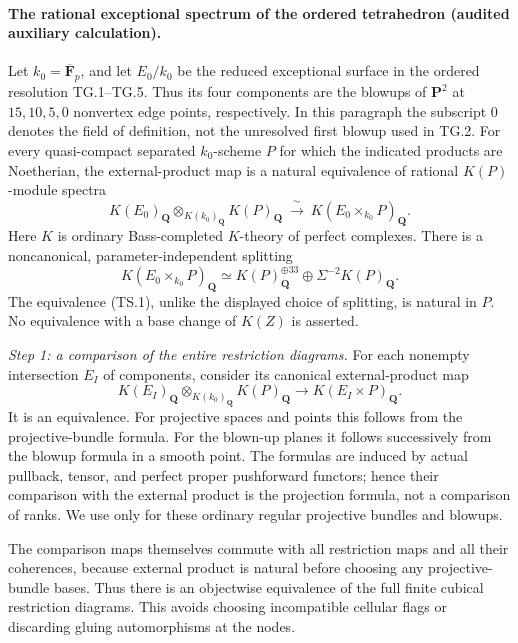 \paragraph{The rational exceptional spectrum of the ordered tetrahedron
(audited auxiliary calculation).}
Let $k_0=\overline{\mathbf F}_p$, and let $E_0/k_0$ be the reduced
exceptional surface in the ordered resolution TG.1--TG.5.  Thus its
four components are the blowups of $\mathbf P^2$ at $15,10,5,0$
nonvertex edge points, respectively.  In this paragraph the subscript
$0$ denotes the field of definition, not the unresolved first blowup
used in TG.2.  For every quasi-compact separated $k_0$-scheme $P$ for
which the indicated products are Noetherian, the external-product map
is a natural equivalence of rational $K(P)$-module spectra
\begin{equation}
 K(E_0)_{\mathbf Q}\otimes_{K(k_0)_{\mathbf Q}}K(P)_{\mathbf Q}
 \ \xrightarrow{\ \sim\ }\ K(E_0\times_{k_0}P)_{\mathbf Q}.
 \tag{TS.1}
\end{equation}
Here $K$ is ordinary Bass-completed $K$-theory of perfect complexes.
There is a noncanonical, parameter-independent splitting
\begin{equation}
 K(E_0\times_{k_0}P)_{\mathbf Q}
 \simeq K(P)_{\mathbf Q}^{\oplus33}
       \oplus \Sigma^{-2}K(P)_{\mathbf Q}.
 \tag{TS.2}
\end{equation}
The equivalence (TS.1), unlike the displayed choice of splitting, is
natural in $P$.  No equivalence with a base change of $K(Z)$ is asserted.

\emph{Step 1: a comparison of the entire restriction diagrams.}
For each nonempty intersection $E_I$ of components, consider its
canonical external-product map
\[
 K(E_I)_{\mathbf Q}\otimes_{K(k_0)_{\mathbf Q}}K(P)_{\mathbf Q}
       \longrightarrow K(E_I\times P)_{\mathbf Q}.
\]
It is an equivalence.  For projective spaces and points this follows
from the projective-bundle formula.  For the blown-up planes it follows
successively from the blowup formula in a smooth point.  The formulas
are induced by actual pullback, tensor, and perfect proper pushforward
functors; hence their comparison with the external product is the
projection formula, not a comparison of ranks.  We use
\citet[Corollaries 3.6 and 4.4, author pp.~12 and 16]
{D_Khan2020Blowup} only for these ordinary regular projective bundles
and blowups.

The comparison maps themselves commute with all restriction maps and
all their coherences, because external product is natural before
choosing any projective-bundle bases.  Thus there is an objectwise
equivalence of the full finite cubical restriction diagrams.  This
avoids choosing incompatible cellular flags or discarding gluing
automorphisms at the nodes.


